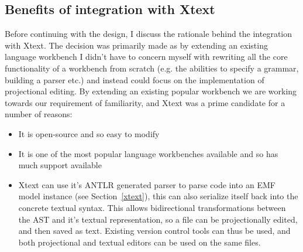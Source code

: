 \documentclass{article}
\begin{document}
\subsection{Benefits of integration with Xtext}\label{integrationWithXtext}
Before continuing with the design, I discuss the rationale behind the integration with Xtext. The decision was primarily made as by extending an existing language workbench I didn't have to concern myself with rewriting all the core functionality of a workbench from scratch (e.g. the abilities to specify a grammar, building a parser etc.) and instead could focus on the implementation of projectional editing. By extending an existing popular workbench we are working towards our \RFamiliarity requirement of familiarity, and Xtext was a prime candidate for a number of reasons:
\begin{itemize}
\item{It is open-source and so easy to modify}
\item{It is one of the most popular language workbenches available and so has much support available}
\item{Xtext can use it's ANTLR generated parser to parse code into an EMF model instance (see Section~\ref{xtext}), this can also serialize itself back into the concrete textual syntax. This allows bidirectional transformations between the AST and it's textual representation, so a file can be projectionally edited, and then saved as text. Existing version control tools can thus be used, and both projectional and textual editors can be used on the same files.}
\end{itemize}
\end{document}

